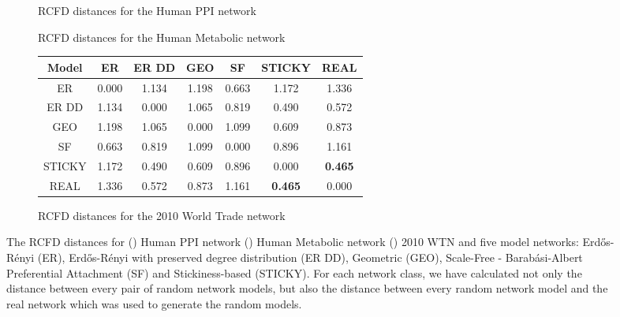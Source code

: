 \newcommand{\tradeagr}{%
    \begin{tabular}{ c | c  c  c  c  c | c }
    Model & ER & ER DD & GEO & SF & STICKY & REAL\\
    \hline
    ER     & 0.000 & 1.134 & 1.198 & 0.663 & 1.172 & 1.336 \\
    ER DD  & 1.134 & 0.000 & 1.065 & 0.819 & 0.490 & 0.572 \\
    GEO    & 1.198 & 1.065 & 0.000 & 1.099 & 0.609 & 0.873 \\
    SF     & 0.663 & 0.819 & 1.099 & 0.000 & 0.896 & 1.161 \\
    STICKY & 1.172 & 0.490 & 0.609 & 0.896 & 0.000 & \textbf{0.465} \\
    \hline
    REAL   & 1.336 & 0.572 & 0.873 & 1.161 & \textbf{0.465} & 0.000\\
    \end{tabular}

}


\begin{figure}[H]%
  \centering
  \vspace{1em}
  \begin{subfigure}{1.0\textwidth}
    \centering
    \humanppiagr   
    \caption{RCFD distances for the Human PPI network}
    \vspace{1.5em}
    \label{tab:rcfd_ppi}
  \end{subfigure}
  \begin{subfigure}{1.0\textwidth}
    \centering
    \hsametaagr   
    \caption{RCFD distances for the Human Metabolic network}
    \vspace{1.5em}
    \label{tab:rcfd_meta}
  \end{subfigure}
  \begin{subfigure}{1.0\textwidth}
    \centering
    \tradeagr 
    \caption{RCFD distances for the 2010 World Trade network}
    \label{tab:rcfd_trade}
  \end{subfigure}
  \caption[RCFD distances for the Human PPI, Human Metabolic and WTN networks.]{The RCFD distances for () Human PPI network () Human Metabolic network () 2010 WTN and five model networks: Erd\H{o}s-R\'{e}nyi (ER), Erd\H{o}s-R\'{e}nyi with preserved degree distribution (ER DD), Geometric (GEO), Scale-Free - Barab\'{a}si-Albert Preferential Attachment (SF) and Stickiness-based (STICKY). For each network class, we have calculated not only the distance between every pair of random network models, but also the distance between every random network model and the real network which was used to generate the random models.}
  \label{gcv_agr}%
\end{figure}

